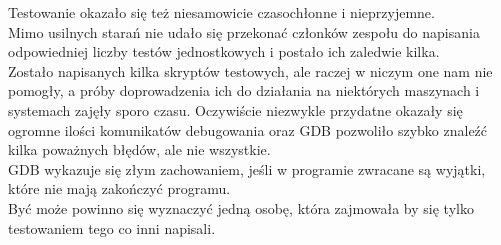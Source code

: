 \documentclass[10pt,a4paper]{article}
\begin{document}
            Testowanie okazało się też niesamowicie czasochłonne i nieprzyjemne.\\
            Mimo usilnych starań nie udało się przekonać członków zespołu do napisania odpowiedniej liczby testów jednostkowych i postało ich zaledwie kilka.\\
            Zostało napisanych kilka skryptów testowych, ale raczej w niczym one nam nie pomogły, a próby doprowadzenia ich do działania na niektórych maszynach i systemach zajęły sporo czasu. Oczywiście niezwykle przydatne okazały się ogromne ilości komunikatów debugowania oraz GDB pozwoliło szybko znaleźć kilka poważnych błędów, ale nie wszystkie. \\
            GDB wykazuje się złym zachowaniem, jeśli w programie zwracane są wyjątki, które nie mają zakończyć programu. \\
            Być może powinno się wyznaczyć jedną osobę, która zajmowała by się tylko testowaniem tego co inni napisali. \\
            
\end{document}
